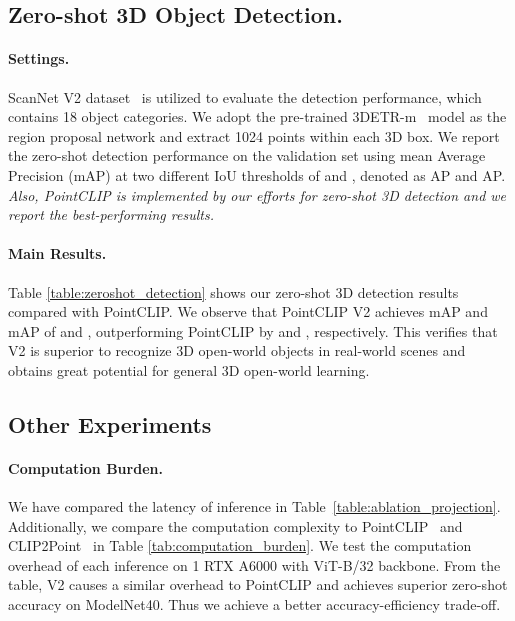 \documentclass[10pt,twocolumn,letterpaper]{article}
\begin{document}
\subsection{Zero-shot 3D Object Detection.} 

\paragraph{Settings.}
ScanNet V2 dataset~\cite{dai2017scannet} is utilized to evaluate the detection performance, which contains 18 object categories. We adopt the pre-trained 3DETR-m~\cite{misra2021end} model as the region proposal network and extract 1024 points within each 3D box. We report the zero-shot detection performance on the validation set using mean Average Precision (mAP) at two different IoU thresholds of  and , denoted as AP and AP. \textit{Also, PointCLIP is implemented by our efforts for zero-shot 3D detection and we report the best-performing results.}

\vspace{-0.1cm}
\paragraph{Main Results.}
Table \ref{table:zeroshot_detection} shows our zero-shot 3D detection results compared with PointCLIP. We observe that PointCLIP V2 achieves mAP and mAP of  and , outperforming PointCLIP by  and , respectively. This verifies that V2 is superior to recognize 3D open-world objects in real-world scenes and obtains great potential for general 3D open-world learning.

\vspace{0.1cm}

\subsection{Other Experiments}

\paragraph{Computation Burden.} We have compared the latency of inference in Table~\ref{table:ablation_projection}. Additionally, we compare the computation complexity to PointCLIP~\cite{zhang2022pointclip} and CLIP2Point~\cite{Huang2022CLIP} in Table \ref{tab:computation_burden}. We test the computation overhead of each inference on 1 RTX A6000 with ViT-B/32 backbone. From the table, V2 causes a similar overhead to PointCLIP and achieves superior zero-shot accuracy on ModelNet40. Thus we achieve a better accuracy-efficiency trade-off.
\end{document}
